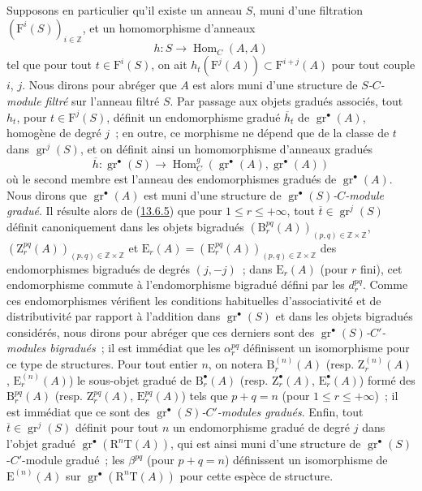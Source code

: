 \begin{env}[13.6.6]
\label{0.13.6.6-fr}
Supposons en particulier qu'il existe un anneau $S$, muni d'une
filtration $(\mathrm F^i(S))_{i\in\mathbb Z}$, et un homomorphisme
d'anneaux
\begin{equation}
\label{0.13.6.6.1-fr}
\tag{13.6.6.1}
h:S\to\operatorname{Hom}_C(A,A)
\end{equation}
tel que pour tout $t\in\mathrm F^i(S)$, on ait
$h_t(\mathrm F^j(A))\subset\mathrm F^{i+j}(A)$ pour tout couple $i$,
$j$. Nous dirons pour abréger que $A$ est alors muni d'une structure de
\emph{$S$-$C$-module filtré} sur l'anneau filtré $S$. Par passage aux
objets gradués associés, tout $h_t$, pour $t\in\mathrm F^j(S)$, définit
un endomorphisme gradué $\overline h_t$ de
$\operatorname{gr}^\bullet(A)$, homogène de degré $j$~; en outre, ce
morphisme ne dépend que de la classe de $t$ dans
$\operatorname{gr}^j(S)$, et on définit ainsi un homomorphisme d'anneaux
gradués
\[
\overline h:\operatorname{gr}^\bullet(S)\to
\operatorname{Hom}_C^g(\operatorname{gr}^\bullet(A),
\operatorname{gr}^\bullet(A))
\]
où le second membre est l'anneau des endomorphismes gradués de
$\operatorname{gr}^\bullet(A)$. Nous dirons que
$\operatorname{gr}^\bullet(A)$ est muni d'une structure de
\emph{$\operatorname{gr}^\bullet(S)$-$C$-module gradué}. Il résulte alors
de (\hyperref[0.13.6.5-fr]{13.6.5}) que pour
$1\leq r\leq+\infty$, tout
$\overline t\in\operatorname{gr}^j(S)$ définit canoniquement dans les
objets bigradués
$(\mathrm B_r^{pq}(A))_{(p,q)\in\mathbb Z\times\mathbb Z}$,
$(\mathrm Z_r^{pq}(A))_{(p,q)\in\mathbb Z\times\mathbb Z}$ et
$\mathrm E_r(A)=(\mathrm E_r^{pq}(A))_{(p,q)\in\mathbb Z\times\mathbb Z}$
des endomorphismes bigradués de degrés $(j,-j)$~; dans
$\mathrm E_r(A)$ (pour $r$ fini), cet endomorphisme commute à
l'endomorphisme bigradué défini par les $d_r^{pq}$. Comme ces
endomorphismes vérifient les conditions habituelles d'associativité et
de distributivité par rapport à l'addition dans
$\operatorname{gr}^\bullet(S)$ et dans les objets bigradués considérés,
nous dirons pour abréger que ces derniers sont des
\emph{$\operatorname{gr}^\bullet(S)$-$C'$-modules bigradués}~; il est
immédiat que les $\alpha_r^{pq}$ définissent un isomorphisme pour ce type
de structures. Pour tout entier $n$, on notera
$\mathrm B_r^{(n)}(A)$ (resp. $\mathrm Z_r^{(n)}(A)$,
$\mathrm E_r^{(n)}(A)$) le sous-objet gradué de
$\mathrm B_r^\bullet(A)$ (resp. $\mathrm Z_r^\bullet(A)$,
$\mathrm E_r^\bullet(A)$) formé des $\mathrm B_r^{pq}(A)$ (resp.
$\mathrm Z_r^{pq}(A)$, $\mathrm E_r^{pq}(A)$) tels que $p+q=n$ (pour
$1\leq r\leq+\infty$)~; il est immédiat que ce sont des
\emph{$\operatorname{gr}^\bullet(S)$-$C'$-modules gradués}. Enfin, tout
$\overline t\in\operatorname{gr}^j(S)$ définit pour tout $n$ un
endomorphisme gradué de degré $j$ dans l'objet gradué
$\operatorname{gr}^\bullet(\mathrm R^n\mathrm T(A))$, qui est ainsi muni
d'une structure de
$\operatorname{gr}^\bullet(S)$-$C'$-module gradué~; les
$\beta^{pq}$ (pour $p+q=n$) définissent un isomorphisme de
$\mathrm E^{(n)}(A)$ sur
$\operatorname{gr}^\bullet(\mathrm R^n\mathrm T(A))$ pour cette espèce
de structure.


\end{env}
